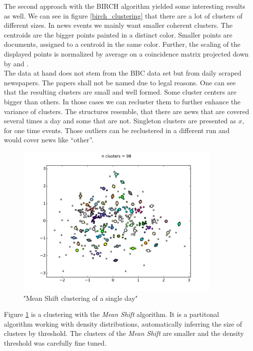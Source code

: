 The second approach with the BIRCH algorithm yielded some interesting results as well. We can see in figure \ref{birch_clustering} that there are a lot of clusters of different sizes.
In news events we mainly want smaller coherent clusters. The centroids are the bigger points painted in a distinct color. Smaller points are documents, assigned to a centroid in the same color. Further, the scaling of the displayed points is normalized by average on a coincidence matrix projected down by \lsa{} and \pca{}.\\

The data at hand does not stem from the BBC data set but from daily scraped newspapers. The papers shall not be named due to legal reasons. One can see that the resulting clusters are small and well formed. Some cluster centers are bigger than others. In those cases we can recluster them to further enhance the variance of clusters. The structures resemble, that there are news that are covered several times a day and some that are not. Singleton clusters are presented as $x$, for one time events. Those outliers can be reclustered in a different run and would cover news like ``other''.

  \begin{figure}[h!]
    \centering
      \includegraphics[width=0.9\textwidth]{mean_shift_clustering.png}
      \caption{"Mean Shift clustering of a single day"}
      \label{mean_shift_clustering}
  \end{figure} 

Figure \ref{mean_shift_clustering} is a clustering with the \emph{Mean Shift} algorithm. It is a partitonal algorithm working with density distributions, automatically inferring the size of clusters by threshold. The clusters of the \emph{Mean Shift} are smaller and the density threshold was carefully fine tuned.\\ 

